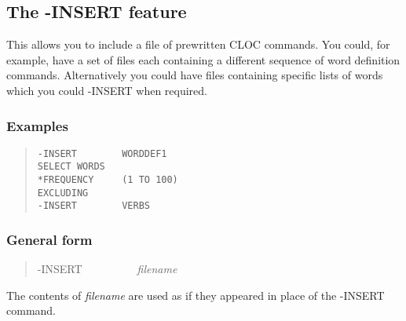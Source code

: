 \subsection{The -INSERT feature}
This allows you to include a file of prewritten CLOC commands. You could,
for example, have a set of files each containing a different sequence
of word definition commands. Alternatively you could have files containing
specific lists of words which you could -INSERT when required.

\subsubsection{Examples}
\begin{quote}
\begin{verbatim}
-INSERT        WORDDEF1
SELECT WORDS
*FREQUENCY     (1 TO 100)
EXCLUDING
-INSERT        VERBS
\end{verbatim}
\end{quote}

\subsubsection{General form}
\begin{quote}
-INSERT~~~~~~~~~~{\em filename}
\end{quote}

The contents of {\em filename} are used as if they appeared in
place of the -INSERT command.

